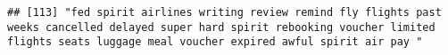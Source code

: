 \documentclass[
]{article}
\begin{document}
\begin{verbatim}
## [113] "fed spirit airlines writing review remind fly flights past weeks cancelled delayed super hard spirit rebooking voucher limited flights seats luggage meal voucher expired awful spirit air pay "                                                                                                                                                                                                                                                                                                                                                                                                                                                                                                                                                                                                                                                                                                                                                                                                                                                                                                                                                                                                                                                                                                                                                                                                                                                                                                                                                                                                                                                                                                                                                                                               

\end{verbatim}
\end{document}
